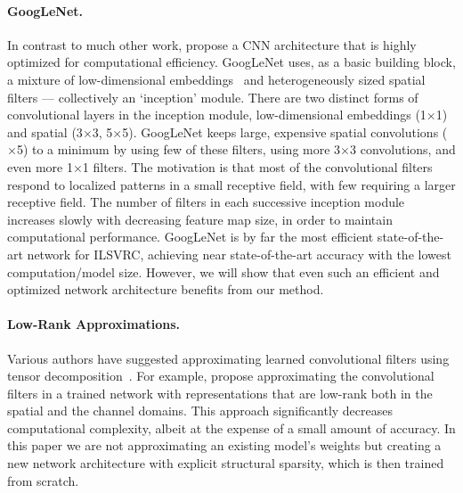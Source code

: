 \documentclass[thesis]{subfiles}
\begin{document}
	\paragraph{GoogLeNet.} In contrast to much other work, \citet{Szegedy2014going} propose a CNN architecture that is highly optimized for computational efficiency. GoogLeNet uses, as a basic building block, a mixture of low-dimensional embeddings~\citep{Lin2013NiN} and heterogeneously sized spatial filters --- collectively an `inception' module. 
	There are two distinct forms of convolutional layers in the inception module, low-dimensional embeddings (1$\times$1) and spatial (3$\times$3, 5$\times $5). GoogLeNet keeps large, expensive spatial convolutions ($\times$5) to a minimum by using few of these filters, using more 3$\times$3 convolutions, and even more 1$\times$1 filters. The motivation is that most of the convolutional filters respond to localized patterns in a small receptive field, with few requiring a larger receptive field. The number of filters in each successive inception module increases slowly with decreasing feature map size, in order to maintain computational performance. GoogLeNet is by far the most efficient state-of-the-art network for ILSVRC, achieving near state-of-the-art accuracy with the lowest computation/model size. However, we will show that even such an efficient and optimized network architecture benefits from our method.
	
	\paragraph{Low-Rank Approximations.}
	Various authors have suggested approximating learned convolutional filters using tensor decomposition~\citep{journals/corr/JaderbergVZ14,journals/corr/LebedevGROL14,Kim2016}. For example, \citet{journals/corr/JaderbergVZ14} propose approximating the convolutional filters in a trained network with representations that are low-rank both in the spatial and the channel domains. This approach significantly decreases computational complexity, albeit at the expense of a small amount of accuracy. In this paper we are not approximating an existing model's weights but creating a new network architecture with explicit structural sparsity, which is then trained from scratch.
	
\end{document}
